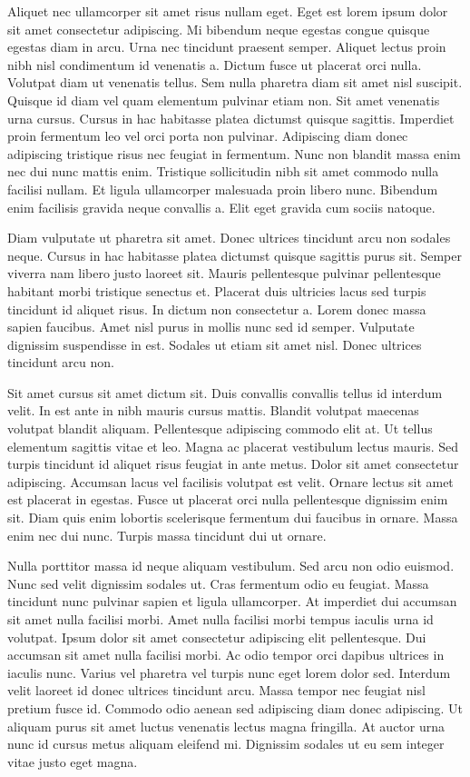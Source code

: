 Aliquet nec ullamcorper sit amet risus nullam eget. Eget est lorem 
ipsum dolor sit amet consectetur adipiscing. Mi bibendum neque egestas 
congue quisque egestas diam in arcu. Urna nec tincidunt praesent semper.
 Aliquet lectus proin nibh nisl condimentum id venenatis a. Dictum fusce
 ut placerat orci nulla. Volutpat diam ut venenatis tellus. Sem nulla 
pharetra diam sit amet nisl suscipit. Quisque id diam vel quam elementum
 pulvinar etiam non. Sit amet venenatis urna cursus. Cursus in hac 
habitasse platea dictumst quisque sagittis. Imperdiet proin fermentum 
leo vel orci porta non pulvinar. Adipiscing diam donec adipiscing 
tristique risus nec feugiat in fermentum. Nunc non blandit massa enim 
nec dui nunc mattis enim. Tristique sollicitudin nibh sit amet commodo 
nulla facilisi nullam. Et ligula ullamcorper malesuada proin libero 
nunc. Bibendum enim facilisis gravida neque convallis a. Elit eget 
gravida cum sociis natoque.


Diam vulputate ut pharetra sit amet. Donec ultrices tincidunt arcu 
non sodales neque. Cursus in hac habitasse platea dictumst quisque 
sagittis purus sit. Semper viverra nam libero justo laoreet sit. Mauris 
pellentesque pulvinar pellentesque habitant morbi tristique senectus et.
 Placerat duis ultricies lacus sed turpis tincidunt id aliquet risus. In
 dictum non consectetur a. Lorem donec massa sapien faucibus. Amet nisl 
purus in mollis nunc sed id semper. Vulputate dignissim suspendisse in 
est. Sodales ut etiam sit amet nisl. Donec ultrices tincidunt arcu non.


Sit amet cursus sit amet dictum sit. Duis convallis convallis tellus 
id interdum velit. In est ante in nibh mauris cursus mattis. Blandit 
volutpat maecenas volutpat blandit aliquam. Pellentesque adipiscing 
commodo elit at. Ut tellus elementum sagittis vitae et leo. Magna ac 
placerat vestibulum lectus mauris. Sed turpis tincidunt id aliquet risus
 feugiat in ante metus. Dolor sit amet consectetur adipiscing. Accumsan 
lacus vel facilisis volutpat est velit. Ornare lectus sit amet est 
placerat in egestas. Fusce ut placerat orci nulla pellentesque dignissim
 enim sit. Diam quis enim lobortis scelerisque fermentum dui faucibus in
 ornare. Massa enim nec dui nunc. Turpis massa tincidunt dui ut ornare.


Nulla porttitor massa id neque aliquam vestibulum. Sed arcu non odio 
euismod. Nunc sed velit dignissim sodales ut. Cras fermentum odio eu 
feugiat. Massa tincidunt nunc pulvinar sapien et ligula ullamcorper. At 
imperdiet dui accumsan sit amet nulla facilisi morbi. Amet nulla 
facilisi morbi tempus iaculis urna id volutpat. Ipsum dolor sit amet 
consectetur adipiscing elit pellentesque. Dui accumsan sit amet nulla 
facilisi morbi. Ac odio tempor orci dapibus ultrices in iaculis nunc. 
Varius vel pharetra vel turpis nunc eget lorem dolor sed. Interdum velit
 laoreet id donec ultrices tincidunt arcu. Massa tempor nec feugiat nisl
 pretium fusce id. Commodo odio aenean sed adipiscing diam donec 
adipiscing. Ut aliquam purus sit amet luctus venenatis lectus magna 
fringilla. At auctor urna nunc id cursus metus aliquam eleifend mi. 
Dignissim sodales ut eu sem integer vitae justo eget magna.


